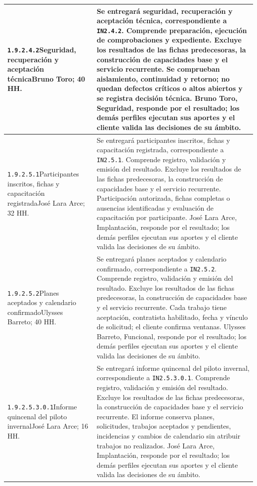 \begin{longtable}{L{52mm}L{91mm}}
\texttt{1.\allowbreak{}9.\allowbreak{}2.\allowbreak{}4.\allowbreak{}2}\newline Seguridad, recuperación y aceptación técnica\newline Bruno Toro; 40 HH. & Se entregará seguridad, recuperación y aceptación técnica, correspondiente a \texttt{IN2.4.2}. Comprende preparación, ejecución de comprobaciones y expediente. Excluye los resultados de las fichas predecesoras, la construcción de capacidades base y el servicio recurrente.  Se comprueban aislamiento, continuidad y retorno; no quedan defectos críticos o altos abiertos y se registra decisión técnica. Bruno Toro, Seguridad, responde por el resultado; los demás perfiles ejecutan sus aportes y el cliente valida las decisiones de su ámbito.\\\hline
\texttt{1.\allowbreak{}9.\allowbreak{}2.\allowbreak{}5.\allowbreak{}1}\newline Participantes inscritos, fichas y capacitación registrada\newline José Lara Arce; 32 HH. & Se entregará participantes inscritos, fichas y capacitación registrada, correspondiente a \texttt{IN2.5.1}. Comprende registro, validación y emisión del resultado. Excluye los resultados de las fichas predecesoras, la construcción de capacidades base y el servicio recurrente.  Participación autorizada, fichas completas o ausencias identificadas y evaluación de capacitación por participante. José Lara Arce, Implantación, responde por el resultado; los demás perfiles ejecutan sus aportes y el cliente valida las decisiones de su ámbito.\\\hline
\texttt{1.\allowbreak{}9.\allowbreak{}2.\allowbreak{}5.\allowbreak{}2}\newline Planes aceptados y calendario confirmado\newline Ulysses Barreto; 40 HH. & Se entregará planes aceptados y calendario confirmado, correspondiente a \texttt{IN2.5.2}. Comprende registro, validación y emisión del resultado. Excluye los resultados de las fichas predecesoras, la construcción de capacidades base y el servicio recurrente.  Cada trabajo tiene aceptación, contratista habilitado, fecha y vínculo de solicitud; el cliente confirma ventanas. Ulysses Barreto, Funcional, responde por el resultado; los demás perfiles ejecutan sus aportes y el cliente valida las decisiones de su ámbito.\\\hline
\texttt{1.\allowbreak{}9.\allowbreak{}2.\allowbreak{}5.\allowbreak{}3.\allowbreak{}0.\allowbreak{}1}\newline Informe quincenal del piloto invernal\newline José Lara Arce; 16 HH. & Se entregará informe quincenal del piloto invernal, correspondiente a \texttt{IN2.5.3.0.1}. Comprende registro, validación y emisión del resultado. Excluye los resultados de las fichas predecesoras, la construcción de capacidades base y el servicio recurrente.  El informe conserva planes, solicitudes, trabajos aceptados y pendientes, incidencias y cambios de calendario sin atribuir trabajos no realizados. José Lara Arce, Implantación, responde por el resultado; los demás perfiles ejecutan sus aportes y el cliente valida las decisiones de su ámbito.\\\hline

\end{longtable}
